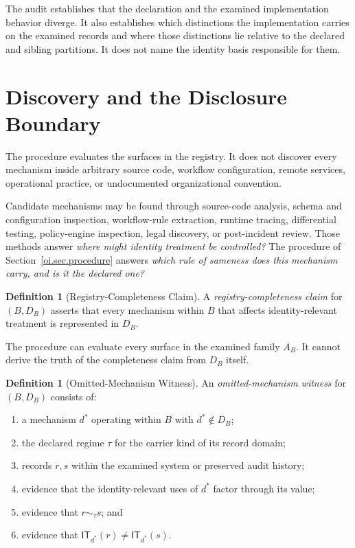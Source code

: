\documentclass[11pt]{article}
\theoremstyle{plain}
\theoremstyle{definition}
\newtheorem{definition}[theorem]{Definition}
\theoremstyle{remark}
\newcommand{\IT}{\ensuremath{\mathsf{IT}}}
\begin{document}
The audit establishes that the declaration
and the examined implementation behavior diverge.
It also establishes which distinctions
the implementation carries on the examined records
and where those distinctions lie
relative to the declared and sibling partitions.
It does not name the identity basis responsible for them.

\section{Discovery and the Disclosure Boundary}
\label{oi.sec.disclosure}

The procedure evaluates the surfaces in the registry.
It does not discover every mechanism inside arbitrary source code, workflow configuration,
remote services, operational practice, or undocumented organizational convention.

Candidate mechanisms may be found through
source-code analysis,
schema and configuration inspection,
workflow-rule extraction,
runtime tracing,
differential testing,
policy-engine inspection,
legal discovery,
or post-incident review.
Those methods answer
\emph{where might identity treatment be controlled?}
The procedure of Section~\ref{oi.sec.procedure} answers
\emph{which rule of sameness does this mechanism carry,
  and is it the declared one?}

\begin{definition}[Registry-Completeness Claim]
  \label{oi.def.completeness}
  A \emph{registry-completeness claim} for \((B,D_B)\)
  asserts that every mechanism within \(B\)
  that affects identity-relevant treatment
  is represented in \(D_B\).
\end{definition}

The procedure can evaluate every surface in the examined family \(A_B\).
It cannot derive the truth of the completeness claim from \(D_B\) itself.

\begin{definition}[Omitted-Mechanism Witness]
  \label{oi.def.omitted}
  An \emph{omitted-mechanism witness} for \((B,D_B)\) consists of:
  \begin{enumerate}[label=(\alph*)]
    \item a mechanism \(d^{\ast}\) operating within \(B\) with \(d^{\ast}\notin D_B\);
    \item the declared regime \(\tau\) for the carrier kind of its record domain;
    \item records \(r,s\) within the examined system or preserved audit history;
    \item evidence that the identity-relevant uses of \(d^{\ast}\)
          factor through its value;
    \item evidence that \(r\sim_{\tau}s\); and
    \item evidence that \(\IT_{d^{\ast}}(r)\neq\IT_{d^{\ast}}(s)\).
  \end{enumerate}
\end{definition}
\end{document}

